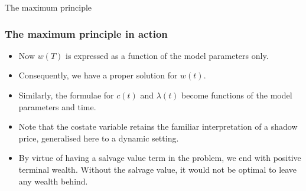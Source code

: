 \documentclass[10pt]{beamer}
\theoremstyle{definition}
\begin{document}
\begin{section}{The maximum principle}
\begin{frame}[fragile]
\frametitle{The maximum principle in action}
\addtocounter{theorem}{-1}
\begin{example}[cont.]
\begin{itemize}\itemsep1em
\item Now $ w(T) $ is expressed as a function of the model parameters only. 
\item Consequently, we have a proper solution for $ w(t) $.
\item Similarly, the formulae for $ c(t) $ and $ \lambda(t) $ become functions of the model parameters and time.
\item Note that the costate variable retains the familiar interpretation of a shadow price, generalised here to a dynamic setting.
\item By virtue of having a salvage value term in the problem, we end with positive terminal wealth. Without the salvage value, it would not be optimal to leave any wealth behind.
\end{itemize}
\end{example}
\end{frame}

\end{section}
\end{document}
